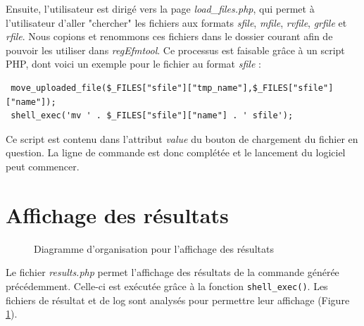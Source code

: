 Ensuite, l'utilisateur est dirigé vers la page \emph{load\_files.php}, qui permet à l'utilisateur d'aller "chercher" les fichiers aux formats \textit{sfile}, \textit{mfile}, \textit{rvfile}, \textit{grfile} et \textit{rfile}. Nous copions et renommons ces fichiers dans le dossier courant afin de pouvoir les utiliser dans \textit{regEfmtool}. Ce processus est faisable grâce à un  script PHP, dont voici un exemple pour le fichier au format \textit{sfile} :\\

\begin{DDbox}{\linewidth}
\begin{lstlisting}
 move_uploaded_file($_FILES["sfile"]["tmp_name"],$_FILES["sfile"]["name"]);
 shell_exec('mv ' . $_FILES["sfile"]["name"] . ' sfile');
\end{lstlisting}
\end{DDbox}

Ce script est contenu dans l'attribut \textit{value} du bouton de chargement du fichier en question. La ligne de commande est donc complétée et le lancement du logiciel peut commencer. 

\section{Affichage des résultats}

\begin{figure}[!ht]
	\begin{center}
		\caption{Diagramme d'organisation pour l'affichage des résultats}
  		\label{DiagResults}
  	\end{center}	
\end{figure}

Le fichier \emph{results.php} permet l'affichage des résultats de la commande générée précédemment. Celle-ci est exécutée grâce à la fonction \texttt{shell\_exec()}. Les fichiers de résultat et de log sont analysés pour permettre leur affichage (Figure \ref{DiagResults}).\\

